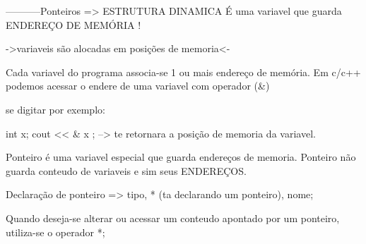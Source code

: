 -----------Ponteiros => ESTRUTURA DINAMICA
É uma variavel que guarda ENDEREÇO DE MEMÓRIA !

->variaveis são alocadas em posições de memoria<-

Cada variavel do programa associa-se 1 ou mais endereço de memória.
Em c/c++ podemos acessar o endere de uma variavel com operador (&)

se digitar por exemplo:

int x;
cout << & x ; --> te retornara a posição de memoria da variavel.

Ponteiro é uma variavel especial que guarda endereços de memoria.
Ponteiro não guarda conteudo de variaveis e sim seus ENDEREÇOS.

Declaração de ponteiro => tipo, * (ta declarando um ponteiro), nome;

Quando deseja-se alterar ou acessar um conteudo apontado por um ponteiro, utiliza-se o operador *;
